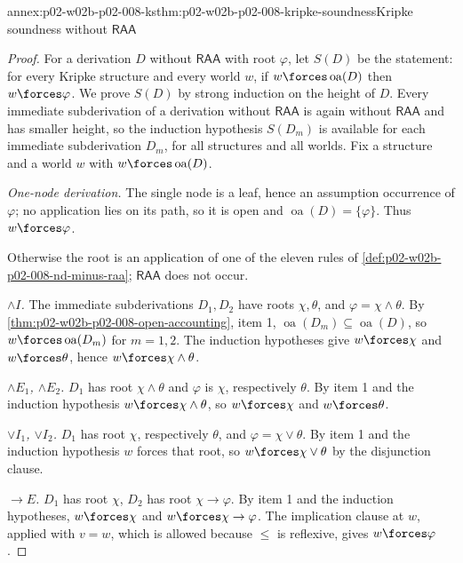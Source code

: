 \begin{annexitem}{annex:p02-w02b-p02-008-ks}{thm:p02-w02b-p02-008-kripke-soundness}{Kripke soundness without \(\mathsf{RAA}\)}
\begin{proof}
For a derivation \(D\) without \(\mathsf{RAA}\) with root \(\varphi\), let
\(S(D)\) be the statement: for every Kripke structure and every world \(w\),
if \(w\forces\operatorname{oa}(D)\) then \(w\forces\varphi\).  We prove
\(S(D)\) by strong induction on the height of \(D\).  Every immediate
subderivation of a derivation without \(\mathsf{RAA}\) is again without
\(\mathsf{RAA}\) and has smaller height, so the induction hypothesis
\(S(D_m)\) is available for each immediate subderivation \(D_m\), for all
structures and all worlds.  Fix a structure and a world \(w\) with
\(w\forces\operatorname{oa}(D)\).

\emph{One-node derivation.}  The single node is a leaf, hence an assumption
occurrence of \(\varphi\); no application lies on its path, so it is open
and \(\operatorname{oa}(D)=\{\varphi\}\).  Thus \(w\forces\varphi\).

Otherwise the root is an application of one of the eleven rules of
\cref{def:p02-w02b-p02-008-nd-minus-raa}; \(\mathsf{RAA}\) does not occur.

\emph{\(\land I\).}  The immediate subderivations \(D_1,D_2\) have roots
\(\chi,\theta\), and \(\varphi=\chi\land\theta\).  By
\cref{thm:p02-w02b-p02-008-open-accounting}, item 1,
\(\operatorname{oa}(D_m)\subseteq\operatorname{oa}(D)\), so
\(w\forces\operatorname{oa}(D_m)\) for \(m=1,2\).  The induction hypotheses
give \(w\forces\chi\) and \(w\forces\theta\), hence \(w\forces\chi\land\theta\).

\emph{\(\land E_1\), \(\land E_2\).}  \(D_1\) has root \(\chi\land\theta\) and
\(\varphi\) is \(\chi\), respectively \(\theta\).  By item 1 and the induction
hypothesis \(w\forces\chi\land\theta\), so \(w\forces\chi\) and
\(w\forces\theta\).

\emph{\(\lor I_1\), \(\lor I_2\).}  \(D_1\) has root \(\chi\), respectively
\(\theta\), and \(\varphi=\chi\lor\theta\).  By item 1 and the induction
hypothesis \(w\) forces that root, so \(w\forces\chi\lor\theta\) by the
disjunction clause.

\emph{\(\to E\).}  \(D_1\) has root \(\chi\), \(D_2\) has root
\(\chi\to\varphi\).  By item 1 and the induction hypotheses,
\(w\forces\chi\) and \(w\forces\chi\to\varphi\).  The implication clause at
\(w\), applied with \(v=w\), which is allowed because \(\leq\) is reflexive,
gives \(w\forces\varphi\).


\end{proof}
\end{annexitem}
